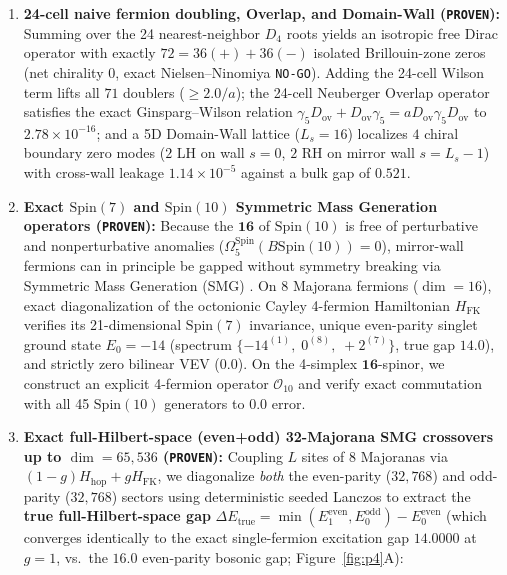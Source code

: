 \documentclass[11pt,a4paper]{article}
\begin{document}
\begin{enumerate}
    \item \textbf{24-cell naive fermion doubling, Overlap, and Domain-Wall (\texttt{PROVEN}):}
    Summing over the 24 nearest-neighbor $D_4$ roots yields an isotropic free Dirac operator with exactly $72 = 36(+) + 36(-)$ isolated Brillouin-zone zeros (net chirality $0$, exact Nielsen--Ninomiya \texttt{NO-GO}). Adding the 24-cell Wilson term lifts all $71$ doublers ($\ge 2.0/a$); the 24-cell Neuberger Overlap operator satisfies the exact Ginsparg--Wilson relation $\gamma_5 D_{\mathrm{ov}} + D_{\mathrm{ov}}\gamma_5 = a D_{\mathrm{ov}}\gamma_5 D_{\mathrm{ov}}$ to $2.78\times 10^{-16}$; and a 5D Domain-Wall lattice ($L_s = 16$) localizes $4$ chiral boundary zero modes ($2$ LH on wall $s=0$, $2$ RH on mirror wall $s=L_s-1$) with cross-wall leakage $1.14\times 10^{-5}$ against a bulk gap of $0.521$.
    \item \textbf{Exact $\mathrm{Spin}(7)$ and $\mathrm{Spin}(10)$ Symmetric Mass Generation operators (\texttt{PROVEN}):}
    Because the $\mathbf{16}$ of $\mathrm{Spin}(10)$ is free of perturbative and nonperturbative anomalies ($\Omega_5^{\mathrm{Spin}}(B\mathrm{Spin}(10)) = 0$), mirror-wall fermions can in principle be gapped without symmetry breaking via Symmetric Mass Generation (SMG) \cite{FidkowskiKitaev2010,WangWen2018}. On 8 Majorana fermions ($\dim = 16$), exact diagonalization of the octonionic Cayley 4-fermion Hamiltonian $H_{\mathrm{FK}}$ verifies its 21-dimensional $\mathrm{Spin}(7)$ invariance, unique even-parity singlet ground state $E_0 = -14$ (spectrum $\{-14^{(1)},\; 0^{(8)},\; +2^{(7)}\}$, true gap $14.0$), and strictly zero bilinear VEV ($0.0$). On the 4-simplex $\mathbf{16}$-spinor, we construct an explicit 4-fermion operator $\mathcal{O}_{10}$ and verify exact commutation with all 45 $\mathrm{Spin}(10)$ generators to $0.0$ error.
    \item \textbf{Exact full-Hilbert-space (even+odd) 32-Majorana SMG crossovers up to $\dim = 65{,}536$ (\texttt{PROVEN}):}
    Coupling $L$ sites of 8 Majoranas via $(1-g)H_{\mathrm{hop}} + g H_{\mathrm{FK}}$, we diagonalize \emph{both} the even-parity ($32{,}768$) and odd-parity ($32{,}768$) sectors using deterministic seeded Lanczos to extract the \textbf{true full-Hilbert-space gap} $\Delta E_{\mathrm{true}} = \min(E_1^{\mathrm{even}}, E_0^{\mathrm{odd}}) - E_0^{\mathrm{even}}$ (which converges identically to the exact single-fermion excitation gap $14.0000$ at $g=1$, vs.\ the $16.0$ even-parity bosonic gap; Figure~\ref{fig:p4}A):
    \begin{itemize}

\end{itemize}
\end{enumerate}
\end{document}
